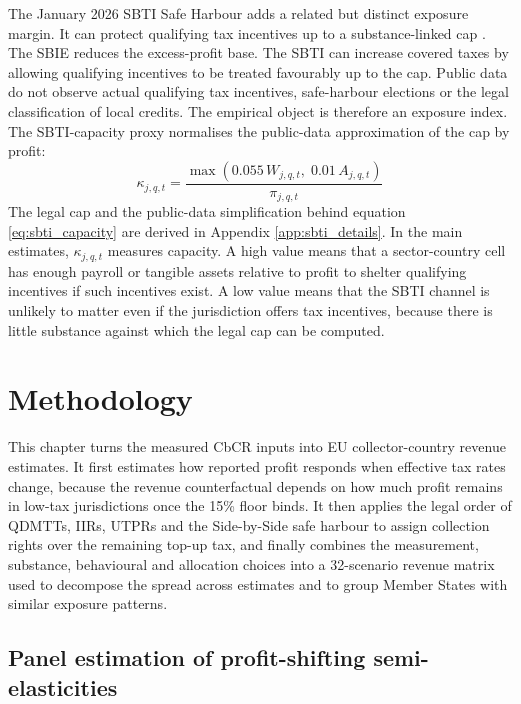 \documentclass[11pt,a4paper]{article}
\begin{document}
The January 2026 SBTI Safe Harbour adds a related but distinct exposure margin. It can protect qualifying tax incentives up to a substance-linked cap \citep{oecd2026}. The SBIE reduces the excess-profit base. The SBTI can increase covered taxes by allowing qualifying incentives to be treated favourably up to the cap. Public data do not observe actual qualifying tax incentives, safe-harbour elections or the legal classification of local credits. The empirical object is therefore an exposure index. The SBTI-capacity proxy normalises the public-data approximation of the cap by profit:
\begin{equation}\label{eq:sbti_capacity}
\kappa_{j,q,t} = \frac{\max\!\left(0.055\,W_{j,q,t},\; 0.01\,A_{j,q,t}\right)}{\pi_{j,q,t}}
\end{equation}
The legal cap and the public-data simplification behind equation \eqref{eq:sbti_capacity} are derived in Appendix \ref{app:sbti_details}. In the main estimates, $\kappa_{j,q,t}$ measures capacity. A high value means that a sector-country cell has enough payroll or tangible assets relative to profit to shelter qualifying incentives if such incentives exist. A low value means that the SBTI channel is unlikely to matter even if the jurisdiction offers tax incentives, because there is little substance against which the legal cap can be computed.

\section{Methodology}\label{sec:methodology}

This chapter turns the measured CbCR inputs into EU collector-country revenue estimates. It first estimates how reported profit responds when effective tax rates change, because the revenue counterfactual depends on how much profit remains in low-tax jurisdictions once the 15\% floor binds. It then applies the legal order of QDMTTs, IIRs, UTPRs and the Side-by-Side safe harbour to assign collection rights over the remaining top-up tax, and finally combines the measurement, substance, behavioural and allocation choices into a 32-scenario revenue matrix used to decompose the spread across estimates and to group Member States with similar exposure patterns.

\subsection{Panel estimation of profit-shifting semi-elasticities}\label{sec:estimation}
\end{document}
